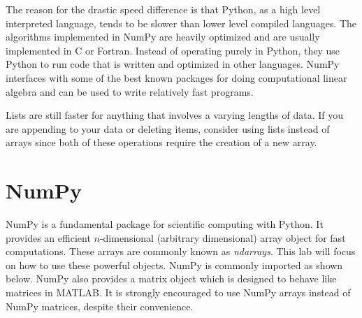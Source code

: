 % 

The reason for the drastic speed difference is that Python, as a high level interpreted language, tends to be slower than lower level compiled languages.
The algorithms implemented in NumPy are heavily optimized and are usually implemented in C or Fortran.
Instead of operating purely in Python, they use Python to run code that is written and optimized in other languages.
NumPy interfaces with some of the best known packages for doing computational linear algebra and can be used to write relatively fast programs.

Lists are still faster for anything that involves a varying lengths of data.
If you are appending to your data or deleting items, consider using lists instead of arrays since both of these operations require the creation of a new array.

\section*{NumPy}
NumPy is a fundamental package for scientific computing with Python.
It provides an efficient $n$-dimensional (arbitrary dimensional) array object for fast computations.
These arrays are commonly known as \emph{ndarrays}.
This lab will focus on how to use these powerful objects.
NumPy is commonly imported as shown below.  NumPy also provides a matrix object which is designed to behave like matrices in MATLAB.  It is strongly encouraged to use NumPy arrays instead of NumPy matrices, despite their convenience.

